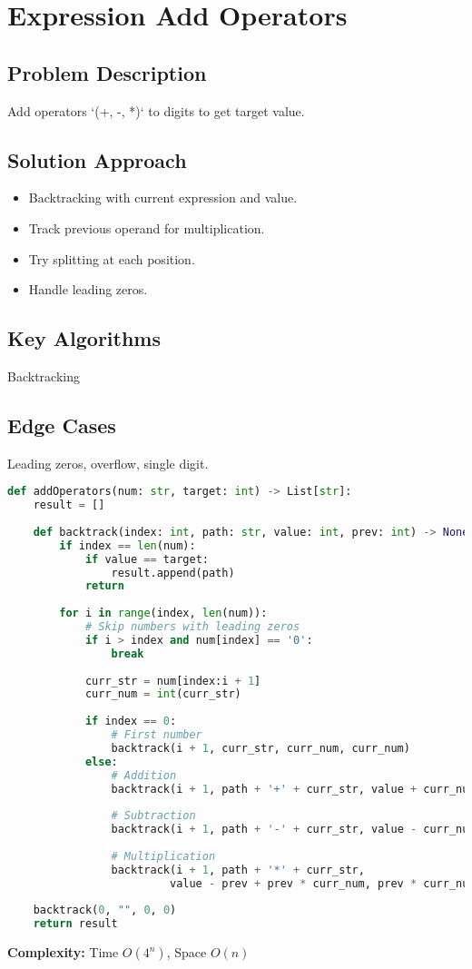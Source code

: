 \documentclass[10pt, a4paper]{article}
\begin{document}
\section{Expression Add Operators}
\subsection*{Problem Description}
Add operators `(+, -, *)` to digits to get target value.

\subsection*{Solution Approach}
\begin{itemize}
    \item Backtracking with current expression and value.
    \item Track previous operand for multiplication.
    \item Try splitting at each position.
    \item Handle leading zeros.
\end{itemize}

\subsection*{Key Algorithms}
Backtracking

\subsection*{Edge Cases}
Leading zeros, overflow, single digit.

\begin{lstlisting}[language=Python]
def addOperators(num: str, target: int) -> List[str]:
    result = []
    
    def backtrack(index: int, path: str, value: int, prev: int) -> None:
        if index == len(num):
            if value == target:
                result.append(path)
            return
        
        for i in range(index, len(num)):
            # Skip numbers with leading zeros
            if i > index and num[index] == '0':
                break
            
            curr_str = num[index:i + 1]
            curr_num = int(curr_str)
            
            if index == 0:
                # First number
                backtrack(i + 1, curr_str, curr_num, curr_num)
            else:
                # Addition
                backtrack(i + 1, path + '+' + curr_str, value + curr_num, curr_num)
                
                # Subtraction
                backtrack(i + 1, path + '-' + curr_str, value - curr_num, -curr_num)
                
                # Multiplication
                backtrack(i + 1, path + '*' + curr_str, 
                         value - prev + prev * curr_num, prev * curr_num)
    
    backtrack(0, "", 0, 0)
    return result
\end{lstlisting}
\textbf{Complexity:} Time $O(4^n)$, Space $O(n)$
\end{document}
